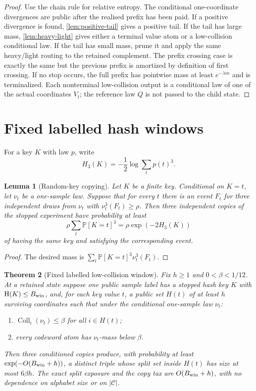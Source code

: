 \documentclass[11pt]{article}
\newcommand{\Cref}[1]{\ref{#1}}
\newtheorem{theorem}{Theorem}[section]
\newtheorem{lemma}[theorem]{Lemma}
\theoremstyle{remark}
\newcommand{\C}{\mathcal C}
\newcommand{\Prob}{\mathbb P}
\newcommand{\HH}{\mathrm H}
\newcommand{\Coll}{\operatorname{Coll}}
\begin{document}
\begin{proof}
Use the chain rule for relative entropy.  The conditional one-coordinate divergences are public after the realised prefix has been paid.  If a positive divergence is found, \Cref{lem:positive-tail} gives a positive tail.  If the tail has large mass, \Cref{lem:heavy-light} gives either a terminal value atom or a low-collision conditional law.  If the tail has small mass, prune it and apply the same heavy/light routing to the retained complement.  The prefix crossing case is exactly the same but the previous prefix is amortized by definition of first crossing.  If no stop occurs, the full prefix has pointwise mass at least $e^{-\lambda m}$ and is terminalized.  Each nonterminal low-collision output is a conditional law of one of the actual coordinates $V_t$; the reference law $Q$ is not passed to the child state.
\end{proof}

\section{Fixed labelled hash windows}

For a key $K$ with law $p$, write
\[
        H_3(K)=-\frac{1}{2}\log\sum_t p(t)^3.
\]

\begin{lemma}[Random-key copying]\label{lem:random-copy}
Let $K$ be a finite key.  Conditional on $K=t$, let $\nu_t$ be a one-sample law.  Suppose that for every $t$ there is an event $F_t$ for three independent draws from $\nu_t$ with $\nu_t^3(F_t)\ge\rho$.  Then three independent copies of the stopped experiment have probability at least
\[
        \rho\sum_t\Prob[K=t]^3=\rho\exp(-2H_3(K))
\]
of having the same key and satisfying the corresponding event.
\end{lemma}

\begin{proof}
The desired mass is $\sum_t\Prob[K=t]^3\nu_t^3(F_t)$.
\end{proof}

\begin{theorem}[Fixed labelled low-collision window]\label{thm:fixed-window}
Fix $h\ge1$ and $0<\beta<1/12$.  At a retained state suppose one public sample label has a stopped hash key $K$ with $\HH(K)\le B_{\rm win}$, and, for each key value $t$, a public set $H(t)$ of at least $h$ surviving coordinates such that under the conditional one-sample law $\nu_t$:
\begin{enumerate}[label=\textup{(\roman*)}]
\item $\Coll_i(\nu_t)\le\beta$ for all $i\in H(t)$;
\item every codeword atom has $\nu_t$-mass below $\beta$.
\end{enumerate}
Then three conditioned copies produce, with probability at least $\exp(-O(B_{\rm win}+h))$, a distinct triple whose split set inside $H(t)$ has size at most $6\beta h$.  The exact split exposure and the copy tax are $O(B_{\rm win}+h)$, with no dependence on alphabet size or on $|\C|$.
\end{theorem}
\end{document}
